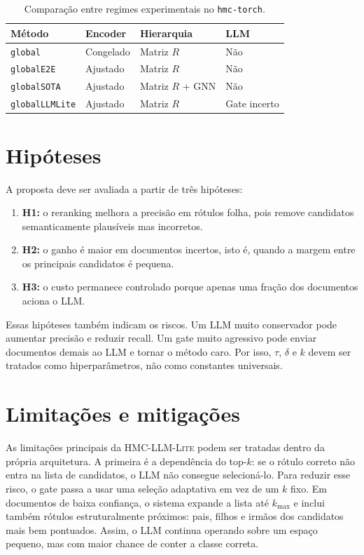 \documentclass[11pt,a4paper]{article}
\newcommand{\method}{\textsc{HMC-LLM-Lite}}
\newcommand{\repo}{\texttt{hmc-torch}}
\begin{document}
\begin{table}[htbp]
\centering
\begin{tabular}{llll}
\toprule
\textbf{Método} & \textbf{Encoder} & \textbf{Hierarquia} & \textbf{LLM} \\
\midrule
\texttt{global} & Congelado & Matriz $R$ & Não \\
\texttt{globalE2E} & Ajustado & Matriz $R$ & Não \\
\texttt{globalSOTA} & Ajustado & Matriz $R$ + GNN & Não \\
\texttt{globalLLMLite} & Ajustado & Matriz $R$ & Gate incerto \\
\bottomrule
\end{tabular}
\caption{Comparação entre regimes experimentais no \repo.}
\label{tab:methods}
\end{table}

\section{Hipóteses}

A proposta deve ser avaliada a partir de três hipóteses:

\begin{enumerate}[leftmargin=*, itemsep=2pt]
  \item \textbf{H1:} o reranking melhora a precisão em rótulos folha, pois remove
        candidatos semanticamente plausíveis mas incorretos.
  \item \textbf{H2:} o ganho é maior em documentos incertos, isto é, quando a
        margem entre os principais candidatos é pequena.
  \item \textbf{H3:} o custo permanece controlado porque apenas uma fração dos
        documentos aciona o LLM.
\end{enumerate}

Essas hipóteses também indicam os riscos. Um LLM muito conservador pode aumentar
precisão e reduzir recall. Um gate muito agressivo pode enviar documentos demais
ao LLM e tornar o método caro. Por isso, $\tau$, $\delta$ e $k$ devem ser tratados
como hiperparâmetros, não como constantes universais.

\section{Limitações e mitigações}

As limitações principais da \method{} podem ser tratadas dentro da própria
arquitetura. A primeira é a dependência do top-$k$: se o rótulo correto não entra
na lista de candidatos, o LLM não consegue selecioná-lo. Para reduzir esse risco,
o gate passa a usar uma seleção adaptativa em vez de um $k$ fixo. Em documentos
de baixa confiança, o sistema expande a lista até $k_{\max}$ e inclui também
rótulos estruturalmente próximos: pais, filhos e irmãos dos candidatos mais bem
pontuados. Assim, o LLM continua operando sobre um espaço pequeno, mas com maior
chance de conter a classe correta.
\end{document}

